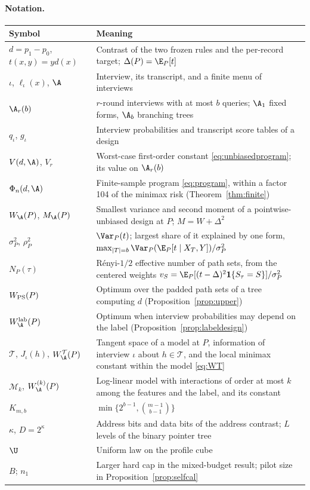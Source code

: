 \paragraph{Notation.}
\begin{center}\small
\begin{tabular}{lp{10.5cm}}
\toprule
Symbol & Meaning\\
\midrule
$d=p_1-p_0$, $t(x,y)=yd(x)$ & Contrast of the two frozen rules and the per-record target; $\Delta(P)=\E_P[t]$\\
$\iota$, $\ell_\iota(x)$, $\A$ & Interview, its transcript, and a finite menu of interviews\\
$\A_r(b)$ & $r$-round interviews with at most $b$ queries; $\A_1$ fixed forms, $\A_b$ branching trees\\
$q_\iota$, $g_\iota$ & Interview probabilities and transcript score tables of a design\\
$V(d,\A)$, $V_r$ & Worst-case first-order constant \eqref{eq:unbiasedprogram}; its value on $\A_r(b)$\\
$\Phi_n(d,\A)$ & Finite-sample program \eqref{eq:program}, within a factor 104 of the minimax risk (Theorem~\ref{thm:finite})\\
$W_\A(P)$, $M_\A(P)$ & Smallest variance and second moment of a pointwise-unbiased design at $P$; $M=W+\Delta^2$\\
$\sigma_P^2$, $\rho_P^2$ & $\Var_P(t)$; largest share of it explained by one form, $\max_{|T|=b}\Var_P(\E_P[t\mid X_T,Y])/\sigma_P^2$\\
$N_P(\tau)$ & R\'enyi-$1/2$ effective number of path sets, from the centered weights $v_S=\E_P[(t-\Delta)^2\mathbf 1\{S_\tau=S\}]/\sigma_P^2$\\
$W_{\rm PS}(P)$ & Optimum over the padded path sets of a tree computing $d$ (Proposition~\ref{prop:upper})\\
$W^{\rm lab}_\A(P)$ & Optimum when interview probabilities may depend on the label (Proposition~\ref{prop:labeldesign})\\
$\mathcal T$, $J_\iota(h)$, $W^{\mathcal T}_\A(P)$ & Tangent space of a model at $P$, information of interview $\iota$ about $h\in\mathcal T$, and the local minimax constant within the model \eqref{eq:WT}\\
$\mathcal M_k$, $W^{(k)}_\A(P)$ & Log-linear model with interactions of order at most $k$ among the features and the label, and its constant\\
$K_{m,b}$ & $\min\{2^{b-1},\binom{m-1}{b-1}\}$\\
$\kappa$, $D=2^\kappa$ & Address bits and data bits of the address contrast; $L$ levels of the binary pointer tree\\
$\U$ & Uniform law on the profile cube\\
$B$; $n_1$ & Larger hard cap in the mixed-budget result; pilot size in Proposition~\ref{prop:selfcal}\\
\bottomrule
\end{tabular}
\end{center}

